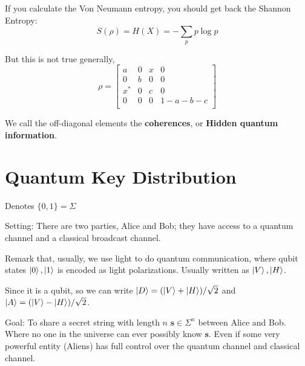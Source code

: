 \documentclass[%
 reprint,
superscriptaddress,
 amsmath,amssymb,
 aps,
]{revtex4-2}
\begin{document}
If you calculate the Von Neumann entropy, you should get back the Shannon Entropy:
\begin{equation}
    S(\rho) = H(X) = -\sum_p p\log p
\end{equation}

But this is not true generally, \begin{equation}
    \rho = \begin{bmatrix}
        a & 0 & x & 0\\
        0 & b & 0 & 0\\
        x^* & 0 & c & 0\\
        0 & 0 & 0 & 1-a-b-c\\
    \end{bmatrix}
\end{equation}

We call the off-diagonal elements the \textbf{coherences}, or \textbf{Hidden quantum information}.

\section{Quantum Key Distribution}

Denotes $\{0, 1\}=\Sigma$

Setting: There are two parties, Alice and Bob; they have access to a quantum channel and a classical broadcast channel.

Remark that, usually, we use light to do quantum communication, where qubit states $\ket{0}, \ket{1}$ is encoded as light polarizations. Usually written as $\ket{V}, \ket{H}$. 

Since it is a qubit, so we can write $\ket{D}=(\ket{V}+\ket{H})/\sqrt{2}$ and $\ket{A}=(\ket{V}-\ket{H})/\sqrt{2}$.

Goal: To share a secret string with length $n$ $\mathbf{s}\in \Sigma^n$ between Alice and Bob. Where no one in the universe can ever possibly know $\mathbf{s}$. Even if some very powerful entity (Aliens) has full control over the quantum channel and classical channel.
\end{document}
